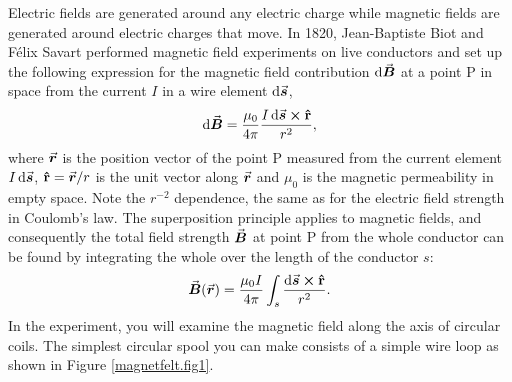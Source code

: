 \documentclass[../Elmag-labhefte-2020.tex]{subfiles}
\begin{document}
Electric fields are generated around any electric charge while magnetic fields are generated around electric charges that move. In 1820, Jean-Baptiste Biot and Félix Savart performed magnetic field experiments on live conductors and set up the following expression for the magnetic field contribution $\dd{\va*{B}}$ at a point P in space from the current $I$ in a wire element $\dd{\va*{s}}$,
\begin{equation}
    \dd{\va*{B}} = \frac{\mu_0}{4\pi} \frac{I \dd{\va*{s}} \cross \vu{r}}{r^2} ,
    \label{eq:Biot.Savart}
\end{equation}
where $\va*{r}$ is the position vector of the point P measured from the current element $I \dd{\va*{s}}$, $\vu{r} = \va*{r}/r$ is the unit vector along $\va*{r}$ and $\mu_0$ is the magnetic permeability in empty space. Note the $r^{-2}$ dependence, the same as for the electric field strength in Coulomb's law. The superposition principle applies to magnetic fields, and consequently the total field strength $\va*{B}$ at point P from the whole conductor can be found by integrating the whole over the length of the conductor $s$:
\begin{equation}
    \va*{B}(\va*{r}) = \frac{\mu_0 I}{4 \pi} \int_s \frac{ \dd{\va*{s}} \cross \vu{r}} {r^2} .
    \label{eq:Biot.Savart2}
\end{equation}
%
In the experiment, you will examine the magnetic field along the axis of circular coils. The simplest circular spool you can make consists of a simple wire loop as shown in Figure \ref{magnetfelt.fig1}.
%
\end{document}
